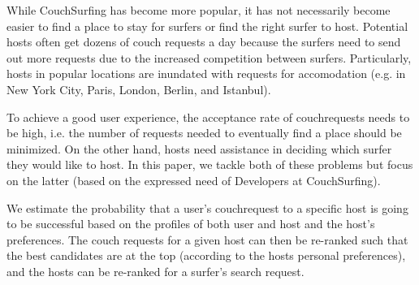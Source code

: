 While CouchSurfing has become more popular, it has not necessarily become easier to find a place to stay for surfers or find the right surfer to host. Potential hosts often get dozens of couch requests a day because the surfers need to send out more requests due to the increased competition between surfers. Particularly, hosts in popular locations are inundated with requests for accomodation (e.g. in New York City, Paris, London, Berlin, and Istanbul).

To achieve a good user experience, the acceptance rate of couchrequests needs to be high, i.e. the number of requests needed to eventually find a place should be minimized. On the other hand, hosts need assistance in deciding which surfer they would like to host. In this paper, we tackle both of these problems but focus on the latter (based on the expressed need of Developers at CouchSurfing).

We estimate the probability that a user's couchrequest to a specific host is going to be successful based on the profiles of both user and host and the host's preferences. The couch requests for a given host can then be re-ranked such that the best candidates are at the top (according to the hosts personal preferences), and the hosts can be re-ranked for a surfer's search request.
